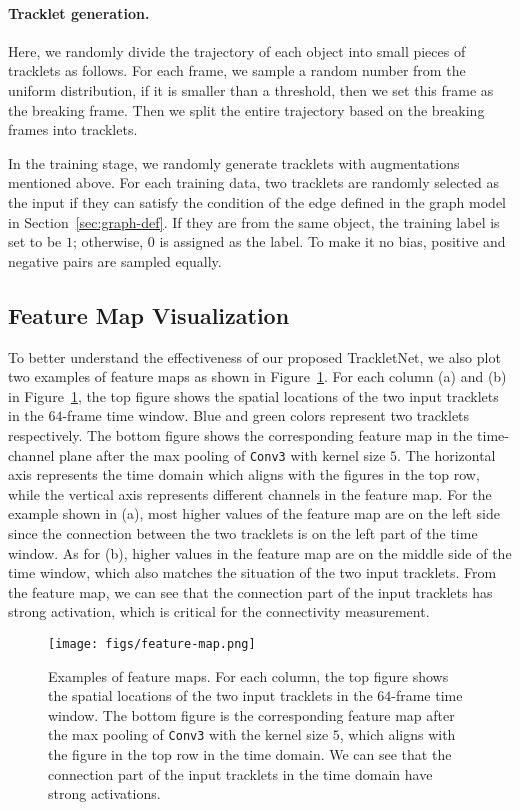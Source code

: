 \documentclass[10pt,twocolumn,letterpaper]{article}
\begin{document}
\paragraph{Tracklet generation.} Here, we randomly divide the trajectory of each object into small pieces of tracklets as follows. For each frame, we sample a random number from the uniform distribution, if it is smaller than a threshold, then we set this frame as the breaking frame. Then we split the entire trajectory based on the breaking frames into tracklets.


In the training stage, we randomly generate tracklets with augmentations mentioned above. For each training data, two tracklets are randomly selected as the input if they can satisfy the condition of the edge defined in the graph model in Section~\ref{sec:graph-def}. If they are from the same object, the training label is set to be $1$; otherwise, $0$ is assigned as the label. To make it no bias, positive and negative pairs are sampled equally.






\subsection{Feature Map Visualization}

To better understand the effectiveness of our proposed TrackletNet, we also plot two examples of feature maps as shown in Figure~\ref{fig:feature-map}. For each column (a) and (b) in Figure~\ref{fig:feature-map}, the top figure shows the spatial locations of the two input tracklets in the $64$-frame time window. Blue and green colors represent two tracklets respectively. The bottom figure shows the corresponding feature map in the time-channel plane after the max pooling of \texttt{Conv3} with kernel size $5$. The horizontal axis represents the time domain which aligns with the figures in the top row, while the vertical axis represents different channels in the feature map. For the example shown in (a), most higher values of the feature map are on the left side since the connection between the two tracklets is on the left part of the time window. As for (b), higher values in the feature map are on the middle side of the time window, which also matches the situation of the two input tracklets. From the feature map, we can see that the connection part of the input tracklets has strong activation, which is critical for the connectivity measurement. 

\begin{figure}
\begin{center}
\texttt{[image: figs/feature-map.png]}
\end{center}
   \caption{Examples of feature maps. For each column, the top figure shows the spatial locations of the two input tracklets in the $64$-frame time window. The bottom figure is the corresponding feature map after the max pooling of \texttt{Conv3} with the kernel size $5$, which aligns with the figure in the top row in the time domain. We can see that the connection part of the input tracklets in the time domain have strong activations.
}
\label{fig:feature-map} 
\end{figure}
\end{document}
